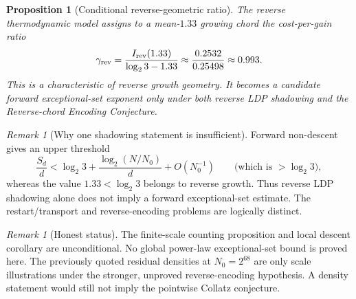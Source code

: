 \documentclass[12pt,a4paper]{article}
\newtheorem{proposition}[theorem]{Proposition}
\theoremstyle{remark}
\newtheorem{remark}[theorem]{Remark}
\begin{document}
\begin{proposition}[Conditional reverse-geometric ratio]
The reverse thermodynamic model assigns to a mean-$1.33$ growing chord the
cost-per-gain ratio
\[
 \gamma_{\rm rev}
 =\frac{I_{\rm rev}(1.33)}{\log_2 3-1.33}
 \approx\frac{0.2532}{0.25498}\approx0.993.
\]
This is a characteristic of reverse growth geometry.  It becomes a candidate
forward exceptional-set exponent only under both reverse LDP shadowing and the
Reverse-chord Encoding Conjecture.
\end{proposition}

\begin{remark}[Why one shadowing statement is insufficient]
Forward non-descent gives an upper threshold
\[
 \frac{S_d}{d}<\log_2 3+\frac{\log_2(N/N_0)}d+O(N_0^{-1}) \qquad \text{(which is } >\log_2 3\text{)},
\]
whereas the value $1.33<\log_2 3$ belongs to reverse growth.  Thus reverse LDP
shadowing alone does not imply a forward exceptional-set estimate.  The
restart/transport and reverse-encoding problems are logically distinct.
\end{remark}

\begin{remark}[Honest status]
The finite-scale counting proposition and local descent corollary are
unconditional.  No global power-law exceptional-set bound is proved here.
The previously quoted residual densities at $N_0=2^{68}$ are only scale
illustrations under the stronger, unproved reverse-encoding hypothesis.  A
density statement would still not imply the pointwise Collatz conjecture.
\end{remark}
\end{document}
